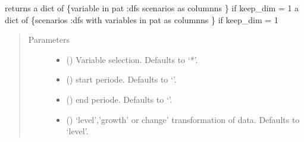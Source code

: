 \documentclass[letterpaper,10pt,english]{sphinxmanual}
\begin{document}
\begin{fulllineitems}
\begin{fulllineitems}
\label{\detokenize{core/modelclass:modelclass.Display_Mixin.keep_get_plotdict}}
\pysigstartsignatures
{}
\pysigstopsignatures
\sphinxAtStartPar
returns
\sphinxhyphen{} a dict of \{variable in pat :dfs scenarios as columnns \} if keep\_dim = 1
\sphinxhyphen{} a dict of \{scenarios       :dfs with variables in pat as columnns \} if keep\_dim = 1
\begin{quote}\begin{description}
\item[{Parameters}] \leavevmode\begin{itemize}
\item {} 
\sphinxAtStartPar
{} (\sphinxstyleliteralemphasis{\sphinxupquote{, }}) \textendash{} Variable selection. Defaults to ‘*’.

\item {} 
\sphinxAtStartPar
{} (\sphinxstyleliteralemphasis{\sphinxupquote{, }}) \textendash{} start periode. Defaults to ‘’.

\item {} 
\sphinxAtStartPar
{} (\sphinxstyleliteralemphasis{\sphinxupquote{, }}) \textendash{} end periode. Defaults to ‘’.

\item {} 
\sphinxAtStartPar
{} (\sphinxstyleliteralemphasis{\sphinxupquote{, }}) \textendash{} ‘level’,’growth’ or change’ transformation of data. Defaults to ‘level’.


\end{itemize}
\end{description}
\end{quote}
\end{fulllineitems}
\end{fulllineitems}
\end{document}
